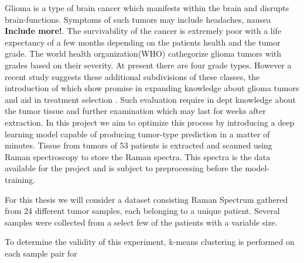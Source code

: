 Glioma is a type of brain cancer which manifests within the brain and disrupts brain-functions. Symptoms of such tumors may include headaches, nausea \textbf{Include more!}. The survivability of the cancer is extremely poor with a life expectancy of a few months depending on the patients health and the tumor grade. The world health organization(WHO) cathegorize glioma tumors with grades based on their severity. At present there are four grade types. However a recent study suggests these additional subdivisions of these classes, the introduction of which show promise in expanding knowledge about glioma tumors and aid in treatment selection \cite{cellsubsets}. Such evaluation require in dept knowledge about the tumor tissue and  further examination which may last for weeks after extraction. In this project we aim to optimize this process by introducing a deep learning model capable of producing tumor-type prediction in a matter of minutes. Tissue from tumors of 53 patients is extracted and scanned using Raman spectroscopy to store the Raman spectra. This spectra is the data available for the project and is subject to preprocessing before the model-training.

For this thesis we will consider a dataset consisting Raman Spectrum gathered from 24 different tumor samples, each belonging to a unique patient. Several samples were collected from a select few of the patients with a variable size.

To determine the validity of this experiment, k-means clustering is performed on each sample pair for 